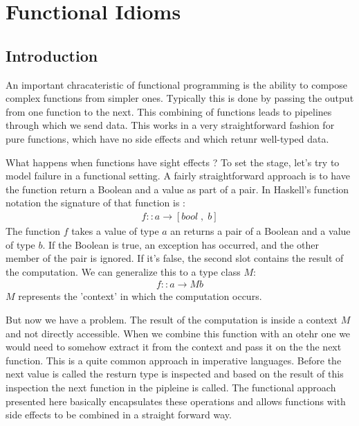 \documentclass[12pt,fleqn]{article}
\begin{document}
\section{Functional Idioms}
\label{sec:funcidioms}
%
%
\subsection{Introduction}
%
%

An important chracateristic of functional programming is the ability to compose complex functions from simpler ones.
Typically this is done by passing the output from one function to the next.
This combining of functions leads to pipelines through which we send data.
This works in a very straightforward fashion for pure functions, which have no side effects and which retunr well-typed data.

What happens when functions have sight effects ?
To set the stage, let's try to model failure in a functional setting.
A fairly straightforward approach is to have the function return a Boolean and a value as part of a pair.
In Haskell's function notation the signature of that function is :
\begin{eqnarray*}
f :: a \rightarrow [ bool \;,\; b ]
\end{eqnarray*}
The function $f$ takes a value of type $a$ an returns a pair of a Boolean and a value of type $b$.
If the Boolean is true, an exception has occurred, and the other member of the pair is ignored.
If it's false, the second slot contains the result of the computation.
We can generalize this to a type class $M$:
\begin{eqnarray*}
f :: a \rightarrow M b
\end{eqnarray*}
$M$ represents the 'context' in which the computation occurs.

But now we have a problem.
The result of the computation is inside a context $M$ and not directly accessible.
When we combine this function with an otehr one we would need to somehow extract it from the context and pass it on the the next function.
This is a quite common approach in imperative languages. 
Before the next value is called the resturn type is inspected and based on the result of this inspection the next function in the pipleine is called.
The functional approach presented here basically encapsulates these operations and allows functions with side effects to be combined in a straight forward way.
\end{document}
